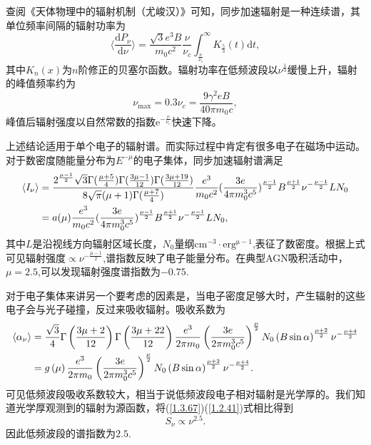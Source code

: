 \documentclass[../天体物理基础.tex]{subfiles}
\begin{document}
查阅《天体物理中的辐射机制（尤峻汉）》可知，同步加速辐射是一种连续谱，其单位频率间隔的辐射功率为
\begin{equation}
\langle\frac{\mathrm{d}P_\nu}{\mathrm{d}\nu}\rangle=\frac{\sqrt3e^3B}{m_0c^2}\frac{\nu}{\nu_c}\int_{\frac{\nu}{\nu_c}}^\infty K_\frac53(t)\mathrm{d}t,
\end{equation}
其中$K_{n}\left(x\right)$为$n$阶修正的贝塞尔函数。辐射功率在低频波段以$\nu^{\frac{1}{3}}$缓慢上升，辐射的峰值频率约为
\begin{equation}
\nu_{\max}=0.3\nu_{c}=\frac{9\gamma^2eB}{40\pi m_0c},
\end{equation}
峰值后辐射强度以自然常数的指数$\mathrm{e}^{-\frac{\nu}{\nu_{c}}}$快速下降。

上述结论适用于单个电子的辐射谱。而实际过程中肯定有很多电子在磁场中运动。对于数密度随能量分布为$E^{-\mu}$的电子集体，同步加速辐射谱满足
\begin{align}
\langle I_{\nu}\rangle&=\frac{2^{\frac{\mu-1}{2}}\sqrt3\Gamma(\frac{\mu+5}{4})\Gamma(\frac{3\mu-1}{12})\Gamma(\frac{3\mu+19}{12})}{8\sqrt\pi(\mu+1)\Gamma(\frac{\mu+7}{4})}\frac{e^{3}}{m_{0}c^{2}}(\frac{3e}{4\pi m_{0}^{3}c^{5}})^{\frac{\mu-1}2}B^{\frac{\mu+1}{2}}\nu^{-\frac{\mu-1}{2}}LN_{0}\notag\\
&=a(\mu)\frac{e^{3}}{m_{0}c^{2}}(\frac{3e}{4\pi m_{0}^{3}c^{5}})^{\frac{\mu-1}2}B^{\frac{\mu+1}{2}}\nu^{-\frac{\mu-1}{2}}LN_{0},\label{1.3.67}
\end{align}
其中$L$是沿视线方向辐射区域长度，$N_{0}$量纲$\mathrm{cm^{-3}\cdot erg^{\mu-1}}$,表征了数密度。根据上式可见辐射强度$\propto{}\nu^{-\frac{\mu-1}{2}}$,谱指数反映了电子能量分布。在典型AGN吸积活动中，$\mu=2.5$,可以发现辐射强度谱指数为$-0.75$.

对于电子集体来讲另一个要考虑的因素是，当电子密度足够大时，产生辐射的这些电子会与光子碰撞，反过来吸收辐射。吸收系数为
\begin{align}
\langle{}\alpha_{\nu}\rangle&=\frac{\sqrt{3}}{4}\Gamma\left(\frac{3\mu+2}{12}\right)\Gamma\left(\frac{3\mu+22}{12}\right)\frac{e^{3}}{2\pi m_{0}}\left(\frac{3e}{2\pi m_{0}^{3}c^{5}}\right)^{\frac{\mu}{2}}N_{0}\left(B\sin\alpha\right)^{\frac{\mu+2}{2}}\nu^{-\frac{\mu+4}{2}}\notag\\
&=g\left(\mu\right)\frac{e^{3}}{2\pi m_{0}}\left(\frac{3e}{2\pi m_{0}^{3}c^{5}}\right)^{\frac{\mu}{2}}N_{0}\left(B\sin\alpha\right)^{\frac{\mu+2}{2}}\nu^{-\frac{\mu+4}{2}}.\label{1.2.41}
\end{align}
可见低频波段吸收系数较大，相当于说低频波段电子相对辐射是光学厚的。我们知道光学厚观测到的辐射为源函数，将(\ref{1.3.67})(\ref{1.2.41})式相比得到
\begin{equation}
S_{\nu}\propto{}\nu^{2.5}.
\end{equation}
因此低频波段的谱指数为$2.5$.
\end{document}
